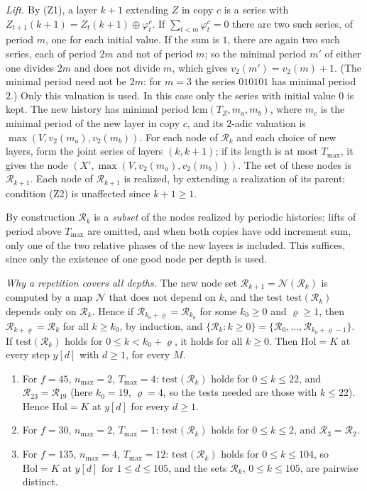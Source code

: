 \emph{Lift.} By (Z1), a layer $k+1$ extending $Z$ in copy $c$ is a series with $Z_{t+1}(k+1)=Z_t(k+1)\oplus \varphi^c_t$. If $\sum_{t<m}\varphi^c_t=0$ there are two such series, of period $m$, one for each initial value. If the sum is $1$, there are again two such series, each of period $2m$ and not of period $m$; so the minimal period $m'$ of either one divides $2m$ and does not divide $m$, which gives $v_2(m')=v_2(m)+1$. (The minimal period need not be $2m$: for $m=3$ the series $010101$ has minimal period $2$.) Only this valuation is used. In this case only the series with initial value $0$ is kept. The new history has minimal period $\mathrm{lcm}(T_Z,m_a,m_b)$, where $m_c$ is the minimal period of the new layer in copy $c$, and its $2$-adic valuation is $\max(V,v_2(m_a),v_2(m_b))$. For each node of $\mathcal R_k$ and each choice of new layers, form the joint series of layers $(k,k+1)$; if its length is at most $T_{\max}$, it gives the node $(X',\max(V,v_2(m_a),v_2(m_b)))$. The set of these nodes is $\mathcal R_{k+1}$. Each node of $\mathcal R_{k+1}$ is realized, by extending a realization of its parent; condition (Z2) is unaffected since $k+1\ge1$.

By construction $\mathcal R_k$ is a \emph{subset} of the nodes realized by periodic histories: lifts of period above $T_{\max}$ are omitted, and when both copies have odd increment sum, only one of the two relative phases of the new layers is included. This suffices, since only the existence of one good node per depth is used.

\emph{Why a repetition covers all depths.} The new node set $\mathcal R_{k+1}=\mathcal N(\mathcal R_k)$ is computed by a map $\mathcal N$ that does not depend on $k$, and the test $\mathrm{test}(\mathcal R_k)$ depends only on $\mathcal R_k$. Hence if $\mathcal R_{k_0+\varrho}=\mathcal R_{k_0}$ for some $k_0\ge0$ and $\varrho\ge1$, then $\mathcal R_{k+\varrho}=\mathcal R_k$ for all $k\ge k_0$, by induction, and $\{\mathcal R_k:k\ge0\}=\{\mathcal R_0,\dots,\mathcal R_{k_0+\varrho-1}\}$. If $\mathrm{test}(\mathcal R_k)$ holds for $0\le k<k_0+\varrho$, it holds for all $k\ge0$. Then $\mathrm{Hol}=K$ at every step $y[d]$ with $d\ge1$, for every $M$.

\begin{proposition}\label{pm:prop:cert}
\begin{enumerate}
\item For $f=45$, $n_{\max}=2$, $T_{\max}=4$: $\mathrm{test}(\mathcal R_k)$ holds for $0\le k\le22$, and $\mathcal R_{23}=\mathcal R_{19}$ (here $k_0=19$, $\varrho=4$, so the tests needed are those with $k\le22$). Hence $\mathrm{Hol}=K$ at $y[d]$ for every $d\ge1$.
\item For $f=30$, $n_{\max}=2$, $T_{\max}=1$: $\mathrm{test}(\mathcal R_k)$ holds for $0\le k\le2$, and $\mathcal R_3=\mathcal R_2$.
\item For $f=135$, $n_{\max}=4$, $T_{\max}=12$: $\mathrm{test}(\mathcal R_k)$ holds for $0\le k\le104$, so $\mathrm{Hol}=K$ at $y[d]$ for $1\le d\le105$, and the sets $\mathcal R_k$, $0\le k\le105$, are pairwise distinct.
\end{enumerate}
\end{proposition}

